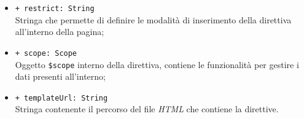 \begin{itemize}
\begin{itemize}
				\item \texttt{+ restrict: String} \\ Stringa che permette di definire le modalità di inserimento della direttiva all'interno della pagina;
				\item \texttt{+ scope: Scope} \\Oggetto \texttt{\$scope} interno della direttiva, contiene le funzionalità per gestire i dati presenti all'interno;
				\item \texttt{+ templateUrl: String} \\ Stringa contenente il percorso del file \textit{HTML} che contiene la direttive.
			\end{itemize}
		\end{itemize}
	